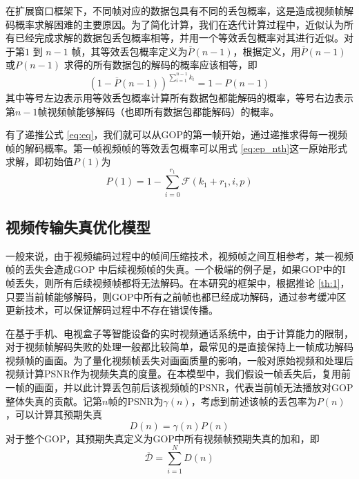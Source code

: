    在扩展窗口框架下，不同帧对应的数据包具有不同的丢包概率，这是造成视频帧解码概率求解困难的主要原因。为了简化计算，我们在迭代计算过程中，近似认为所有已经完成求解的数据包丢包概率相等，并用一个等效丢包概率对其进行近似。对于第$1$ 到 $n-1$ 帧，其等效丢包概率定义为$\overline{P}(n-1)$，根据定义，用$\overline{P}(n-1)$或$P(n-1)$ 求得的所有数据包的解码的概率应该相等，即
    \begin{equation}\label{eq:eq}
    (1 - \overline{P}(n-1))^{\sum_{i=1}^{n-1}k_i} = 1 - P(n-1)
    \end{equation}
    其中等号左边表示用等效丢包概率计算所有数据包都能解码的概率，等号右边表示第$n-1$帧视频帧能够解码（也即所有数据包都能解码）的概率。

    有了递推公式 \ref{eq:eq}，我们就可以从GOP的第一帧开始，通过递推求得每一视频帧的解码概率。第一帧视频帧的等效丢包概率可以用式 \ref{eq:ep_nth}这一原始形式求解，即初始值$P(1)$为
    \begin{equation}\label{eq:first_packet}
    P(1) = 1 - \sum_{i=0}^{r_1} \mathcal{F}(k_1+r_1, i, p)
    \end{equation}


    \subsection{视频传输失真优化模型}
    一般来说，由于视频编码过程中的帧间压缩技术，视频帧之间互相参考，某一视频帧的丢失会造成GOP 中后续视频帧的失真。一个极端的例子是，如果GOP中的I帧丢失，则所有后续视频帧都将无法解码。在本研究的框架中，根据推论 \ref{th:1}，只要当前帧能够解码，则GOP中所有之前帧也都已经成功解码，通过参考缓冲区更新技术，可以保证解码过程中不存在错误传播。

    在基于手机、电视盒子等智能设备的实时视频通话系统中，由于计算能力的限制，对于视频帧解码失败的处理一般都比较简单，最常见的是直接保持上一帧成功解码视频帧的画面。为了量化视频帧丢失对画面质量的影响，一般对原始视频和处理后视频计算PSNR作为视频失真的度量。在本模型中，我们假设一帧丢失后，复用前一帧的画面，并以此计算丢包前后该视频帧的PSNR，代表当前帧无法播放对GOP整体失真的贡献。记第$n$帧的PSNR为$\gamma(n)$，考虑到前述该帧的丢包率为$P(n)$，可以计算其预期失真
    \begin{equation}\label{eq:distortion}
      D(n)=\gamma(n)P(n)
    \end{equation}
    对于整个GOP，其预期失真定义为GOP中所有视频帧预期失真的加和，即
    \begin{equation}\label{eq:t_dist}
    \overline{\mathcal{D}} = \sum_{i=1}^{N}D(n)
    \end{equation}

